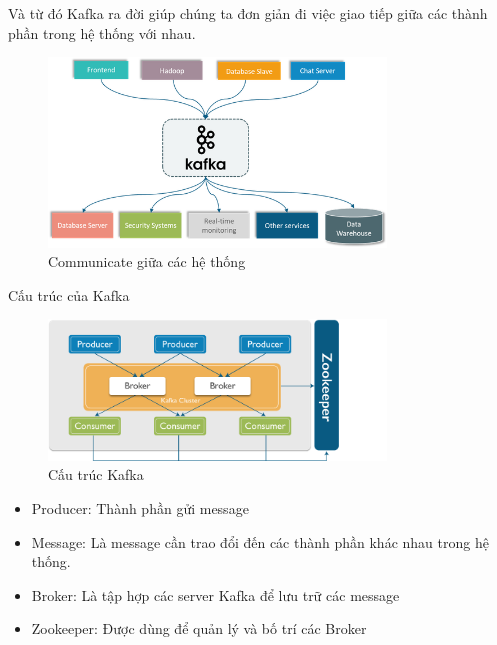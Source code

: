 \begin{itemize}
            Và từ đó Kafka ra đời giúp chúng ta đơn giản đi việc giao tiếp giữa các thành phần trong hệ thống với nhau.
            
             \begin{figure}[!ht]   			\includegraphics[width=0.8\textwidth]{Images/Kafka3.png}
    		\centering
    		\linebreak
    		\caption{Communicate giữa các hệ thống}
            \end{figure}
            
            Cấu trúc của Kafka
            
             \begin{figure}[!ht]   			\includegraphics[width=0.8\textwidth]{Images/Kafka2.png}
    		\centering
    		\linebreak
    		\caption{Cấu trúc Kafka}
            \end{figure}
            
            \begin{itemize}
                \item Producer: Thành phần gửi message
                \item Message: Là message cần trao đổi đến các thành phần khác nhau trong hệ thống.
                \item Broker: Là tập hợp các server Kafka để lưu trữ các message
                \item Zookeeper: Được dùng để quản lý và bố trí các Broker
            \end{itemize}
            

\end{itemize}
